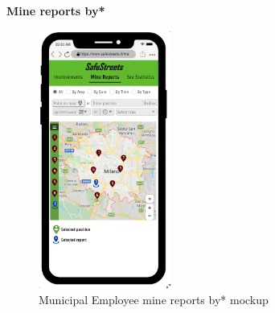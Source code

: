 					\clearpage
					\begin{center}
						{\small \textbf{Mine reports by*}}
					\end{center}
					\vspace{-5mm}
					\begin{figure}[!h]
						\centering
						\includegraphics[height=8.5cm]{images/MockUp/Authority/MunicipalEmployee/MineReports.png}
						\caption{Municipal Employee mine reports by* mockup}
						\end{figure}
